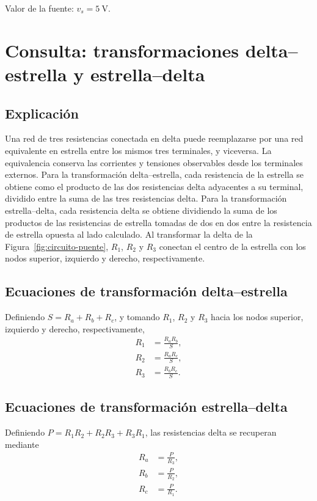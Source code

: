\documentclass[conference,10pt]{IEEEtran}
\begin{document}
\noindent Valor de la fuente: $v_s=5~\mathrm{V}$.

\section{Consulta: transformaciones delta--estrella y estrella--delta}
\subsection{Explicación}
Una red de tres resistencias conectada en delta puede reemplazarse por una red equivalente en estrella entre los mismos tres terminales, y viceversa. La equivalencia conserva las corrientes y tensiones observables desde los terminales externos. Para la transformación delta--estrella, cada resistencia de la estrella se obtiene como el producto de las dos resistencias delta adyacentes a su terminal, dividido entre la suma de las tres resistencias delta. Para la transformación estrella--delta, cada resistencia delta se obtiene dividiendo la suma de los productos de las resistencias de estrella tomadas de dos en dos entre la resistencia de estrella opuesta al lado calculado. Al transformar la delta de la Figura~\ref{fig:circuito-puente}, $R_1$, $R_2$ y $R_3$ conectan el centro de la estrella con los nodos superior, izquierdo y derecho, respectivamente.

\subsection{Ecuaciones de transformación delta--estrella}
Definiendo $S=R_a+R_b+R_c$, y tomando $R_1$, $R_2$ y $R_3$ hacia los nodos superior, izquierdo y derecho, respectivamente,
\begin{align}
  R_1 &= \frac{R_aR_b}{S}, \label{eq:delta-estrella-r1}\\
  R_2 &= \frac{R_aR_c}{S}, \label{eq:delta-estrella-r2}\\
  R_3 &= \frac{R_bR_c}{S}. \label{eq:delta-estrella-r3}
\end{align}

\subsection{Ecuaciones de transformación estrella--delta}
Definiendo $P=R_1R_2+R_2R_3+R_3R_1$, las resistencias delta se recuperan mediante
\begin{align}
  R_a &= \frac{P}{R_3}, \label{eq:estrella-delta-ra}\\
  R_b &= \frac{P}{R_2}, \label{eq:estrella-delta-rb}\\
  R_c &= \frac{P}{R_1}. \label{eq:estrella-delta-rc}
\end{align}
\end{document}
